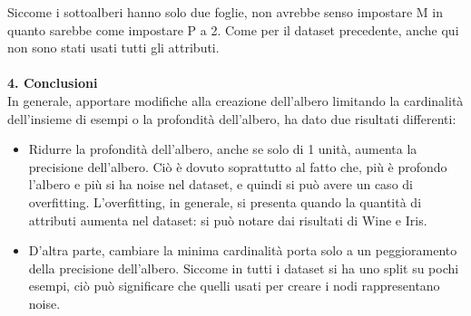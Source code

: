 \documentclass{article}
\begin{document}
\begin{table}[H]
\end{table}
Siccome i sottoalberi hanno solo due foglie, non avrebbe senso impostare M in quanto sarebbe come impostare P a 2.
Come per il dataset precedente, anche qui non sono stati usati tutti gli attributi.\\
\\
{\Large \textbf{{\large{4}}. Conclusioni}}\\
In generale, apportare modifiche alla creazione dell'albero limitando la cardinalità dell'insieme di esempi o la profondità dell'albero, ha dato due risultati differenti:
\begin{itemize}
	\item Ridurre la profondità dell'albero, anche se solo di 1 unità, aumenta la precisione dell'albero. Ciò è dovuto soprattutto al fatto che, più è profondo l'albero e più si ha noise nel dataset, e quindi si può avere un caso di overfitting. L'overfitting, in generale, si presenta quando la quantità di attributi aumenta nel dataset: si può notare dai risultati di Wine e Iris.
	\item D'altra parte, cambiare la minima cardinalità porta solo a un peggioramento della precisione dell'albero. Siccome in tutti i dataset si ha uno split su pochi esempi, ciò può significare che quelli usati per creare i nodi rappresentano noise.
\end{itemize}
\end{document}
